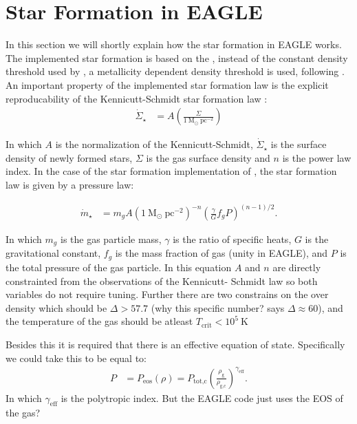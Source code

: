 \section{Star Formation in EAGLE}

In this section we will shortly explain how the star formation in EAGLE works.
The implemented star formation is based on the \citet{schaye2008}, instead of 
the constant density threshold used by \citet{schaye2008}, a metallicity 
dependent density threshold is used, following \citet{schaye2004}. An important 
property of the implemented star formation law is the explicit reproducability 
of the Kennicutt-Schmidt star formation law \citep{kennicutt1998}:
\begin{align}
 \dot{\Sigma}_\star &= A \left( \frac{\Sigma}{1 ~\text{M}_\odot ~\text{pc}^{-2}} \right)
\end{align}

\noindent In which $A$ is the normalization of the Kennicutt-Schmidt, $\dot{\Sigma}_\star$
is the surface density of newly formed stars, $\Sigma$ is the gas surface 
density and $n$ is the power law index. In the case of the star formation 
implementation of \citet{schaye2008}, the star formation law is given by 
a pressure law:

\begin{align}
\dot{m}_\star &= m_g A ( 1~\text{M}_\odot~\text{pc}^{-2})^{-n} \left( 
\frac{\gamma}{G} f_g P \right)^{(n-1)/2}.
\end{align}

\noindent In which $m_g$ is the gas particle mass, $\gamma$ is the ratio of specific heats,
$G$ is the gravitational constant, $f_g$ is the mass fraction of gas (unity in 
EAGLE), and $P$ is the total pressure of the gas particle. In this equation
$A$ and $n$ are directly constrainted from the observations of the Kennicutt-
Schmidt law so both variables do not require tuning. Further there are 
two constrains on the over density which should be $\Delta > 57.7$ (why this 
specific number? \citet{schaye2008} says $\Delta \approx 60$), and the
temperature of the gas should be atleast $T_\text{crit}<10^5 ~\text{K}$

Besides this it is required that there is an effective equation of state. 
Specifically we could take this to be equal to:
\begin{align}
 P &= P_\text{eos} (\rho) = P_\text{tot,c}\left( \frac{\rho_\text{g}}{\rho_\text{g,c}} \right)^{\gamma_\text{eff}}.
\end{align}
\noindent In which $\gamma_\text{eff}$ is the polytropic index. But the EAGLE 
code just uses the EOS of the gas?


